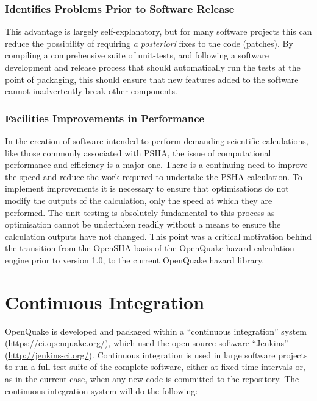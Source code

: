 \subsubsection{Identifies Problems Prior to Software Release}

This advantage is largely self-explanatory, but for many software projects this can reduce the possibility of requiring \emph{a posteriori} fixes to the code (patches). By compiling a comprehensive suite of unit-tests, and following a software development and release process that should automatically run the tests at the point of packaging, this should ensure that new features added to the software cannot inadvertently break other components.

\subsubsection{Facilities Improvements in Performance}

In the creation of software intended to perform demanding scientific calculations, like those commonly associated with PSHA, the issue of computational performance and efficiency is a major one. There is a continuing need to improve the speed and reduce the work required to undertake the PSHA calculation. To implement improvements it is necessary to ensure that optimisations do not modify the outputs of the calculation, only the speed at which they are performed. The unit-testing is absolutely fundamental to this process as optimisation cannot be undertaken readily without a means to ensure the calculation outputs have not changed. This point was a critical motivation behind the transition from the OpenSHA basis of the OpenQuake hazard calculation engine prior to version 1.0, to the current OpenQuake hazard library.

\section{Continuous Integration}

OpenQuake is developed and packaged within a ``continuous integration'' system (\href{https://ci.openquake.org/}{https://ci.openquake.org/}), which used the open-source software ``Jenkins'' (\href{http://jenkins-ci.org/}{http://jenkins-ci.org/}). Continuous integration is used in large software projects to run a full test suite of the complete software, either at fixed time intervals or, as in the current case, when any new code is committed to the repository. The continuous integration system will do the following:


